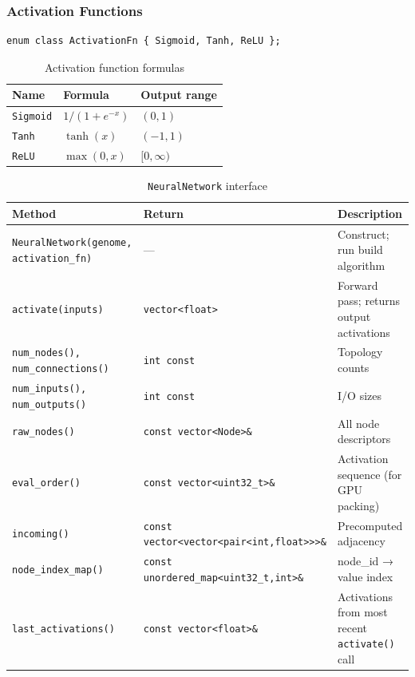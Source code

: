 \subsubsection{Activation Functions}

\begin{lstlisting}
enum class ActivationFn { Sigmoid, Tanh, ReLU };
\end{lstlisting}

\begin{table}[H]
\centering\small
\caption{Activation function formulas}
\begin{tabular}{@{}lll@{}}
\toprule
\textbf{Name} & \textbf{Formula} & \textbf{Output range} \\
\midrule
\texttt{Sigmoid} & $1/(1+e^{-x})$ & $(0,1)$ \\
\texttt{Tanh}    & $\tanh(x)$     & $(-1,1)$ \\
\texttt{ReLU}    & $\max(0,x)$    & $[0,\infty)$ \\
\bottomrule
\end{tabular}
\end{table}

\begin{table}[H]
\centering\small
\caption{\texttt{NeuralNetwork} interface}
\begin{tabularx}{\textwidth}{@{}llX@{}}
\toprule
\textbf{Method} & \textbf{Return} & \textbf{Description} \\
\midrule
\texttt{NeuralNetwork(genome, activation\_fn)} & — & Construct; run build algorithm \\
\texttt{activate(inputs)} & \texttt{vector<float>} & Forward pass; returns output activations \\
\texttt{num\_nodes(), num\_connections()} & \texttt{int const} & Topology counts \\
\texttt{num\_inputs(), num\_outputs()} & \texttt{int const} & I/O sizes \\
\texttt{raw\_nodes()} & \texttt{const vector<Node>\&} & All node descriptors \\
\texttt{eval\_order()} & \texttt{const vector<uint32\_t>\&} & Activation sequence (for GPU packing) \\
\texttt{incoming()} & \texttt{const vector<vector<pair<int,float>>>\&} & Precomputed adjacency \\
\texttt{node\_index\_map()} & \texttt{const unordered\_map<uint32\_t,int>\&} & node\_id → value index \\
\texttt{last\_activations()} & \texttt{const vector<float>\&} & Activations from most recent \texttt{activate()} call \\
\bottomrule
\end{tabularx}
\end{table}

